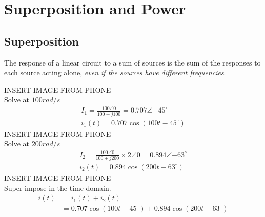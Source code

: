\chapter{Superposition and Power}
\section{Superposition}
\begin{theorem}
    [Superposition]
    The response of a linear circuit to a sum of sources is the sum of the responses to each source acting alone, \textit{even if the sources have different frequencies}.
\end{theorem}

\begin{example}
    INSERT IMAGE FROM PHONE\\
    Solve at $100 rad/s$
    \begin{align}
        \underline{I_1} = \frac{100 \angle{0}}{100 + j100} = 0.707 \angle{-45^\circ} \\
        i_1(t) = 0.707\cos(100t - 45^\circ)
    \end{align}
    INSERT IMAGE FROM PHONE\\
    Solve at $200 rad/s$
    \begin{align}
        \underline{I_2} = \frac{100 \angle{0}}{100 + j200}\times 2\angle{0} = 0.894\angle{-63^\circ} \\
        i_2(t) = 0.894\cos(200t - 63^\circ)
    \end{align}
    INSERT IMAGE FROM PHONE\\
    Super impose in the time-domain. \\
    \begin{align}
        i(t) & = i_1(t) + i_2(t)                                         \\
             & = 0.707\cos(100t - 45^\circ) + 0.894\cos(200t - 63^\circ)
    \end{align}
\end{example}


